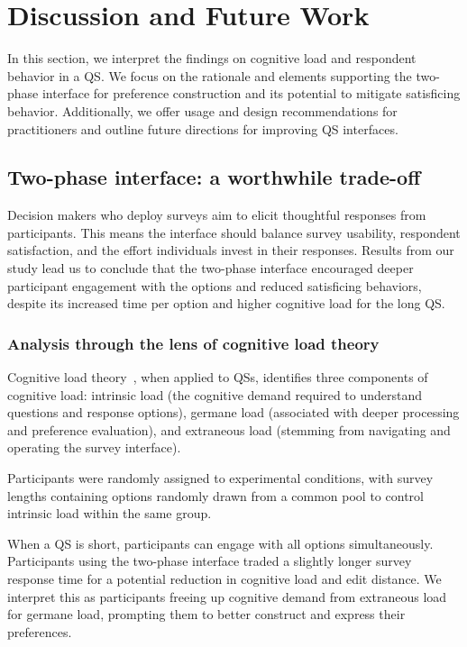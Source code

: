 \section{Discussion and Future Work}
\label{sec:discussion}

In this section, we interpret the findings on cognitive load and respondent behavior in a QS. We focus on the rationale and elements supporting the two-phase interface for preference construction and its potential to mitigate satisficing behavior. Additionally, we offer usage and design recommendations for practitioners and outline future directions for improving QS interfaces.

\subsection{Two-phase interface: a worthwhile trade-off}
Decision makers who deploy surveys aim to elicit thoughtful responses from participants. This means the interface should balance survey usability, respondent satisfaction, and the effort individuals invest in their responses. Results from our study lead us to conclude that the two-phase interface encouraged deeper participant engagement with the options and reduced satisficing behaviors, despite its increased time per option and higher cognitive load for the long QS.

\subsubsection{Analysis through the lens of cognitive load theory}
Cognitive load theory~\cite{swellerCognitiveLoadTheory2011}, when applied to QSs, identifies three components of cognitive load: intrinsic load (the cognitive demand required to understand questions and response options), germane load (associated with deeper processing and preference evaluation), and extraneous load (stemming from navigating and operating the survey interface).

Participants were randomly assigned to experimental conditions, with survey lengths containing options randomly drawn from a common pool to control intrinsic load within the same group. 

When a QS is short, participants can engage with all options simultaneously. Participants using the two-phase interface traded a slightly longer survey response time for a potential reduction in cognitive load and edit distance. We interpret this as participants freeing up cognitive demand from extraneous load for germane load, prompting them to better construct and express their preferences.

